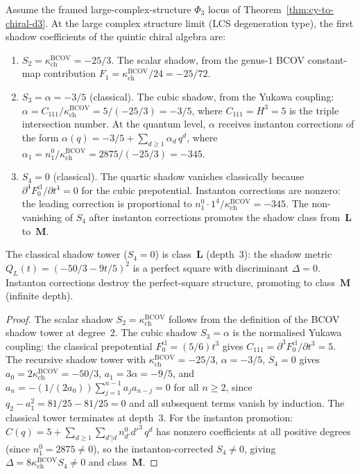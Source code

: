 \begin{proposition}
\label{prop:quintic-shadow-coefficients}
Assume the framed large-complex-structure $\Phi_3$ locus of
Theorem~\textup{\ref{thm:cy-to-chiral-d3}}. At the large complex
structure limit \textup{(}LCS degeneration type\textup{)}, the first
shadow coefficients of the quintic chiral algebra are:
\begin{enumerate}[label=(\roman*)]
 \item $S_2 = \kappa_{\mathrm{ch}}^{\mathrm{BCOV}} = -25/3$. The scalar shadow, from the genus-$1$ BCOV constant-map contribution $F_1 = \kappa_{\mathrm{ch}}^{\mathrm{BCOV}}/24 = -25/72$.
 \item $S_3 = \alpha = -3/5$ \textup{(}classical\textup{)}. The cubic shadow, from the Yukawa coupling: $\alpha = C_{111}/\kappa_{\mathrm{ch}}^{\mathrm{BCOV}} = 5/(-25/3) = -3/5$, where $C_{111} = H^3 = 5$ is the triple intersection number. At the quantum level, $\alpha$ receives instanton corrections of the form $\alpha(q) = -3/5 + \sum_{d \geq 1} \alpha_d \, q^d$, where $\alpha_1 = n^0_1 / \kappa_{\mathrm{ch}}^{\mathrm{BCOV}} = 2875/(-25/3) = -345$.
 \item $S_4 = 0$ \textup{(}classical\textup{)}. The quartic shadow vanishes classically because $\partial^4 F_0^{\mathrm{cl}} / \partial t^4 = 0$ for the cubic prepotential. Instanton corrections are nonzero: the leading correction is proportional to $n^0_1 \cdot 1^4 / \kappa_{\mathrm{ch}}^{\mathrm{BCOV}} = -345$. The non-vanishing of $S_4$ after instanton corrections promotes the shadow class from~$\mathbf{L}$ to~$\mathbf{M}$.
\end{enumerate}
The classical shadow tower \textup{(}$S_4 = 0$\textup{)} is class~$\mathbf{L}$ \textup{(}depth~$3$\textup{)}: the shadow metric $Q_L(t) = (-50/3 - 9t/5)^2$ is a perfect square with discriminant $\Delta = 0$. Instanton corrections destroy the perfect-square structure, promoting to class~$\mathbf{M}$ \textup{(}infinite depth\textup{)}.
\end{proposition}

\begin{proof}
The scalar shadow $S_2 = \kappa_{\mathrm{ch}}^{\mathrm{BCOV}}$ follows from the definition of the BCOV shadow tower at degree~$2$. The cubic shadow $S_3 = \alpha$ is the normalised Yukawa coupling: the classical prepotential $F_0^{\mathrm{cl}} = (5/6) t^3$ gives $C_{111} = \partial^3 F_0^{\mathrm{cl}} / \partial t^3 = 5$. The recursive shadow tower with $\kappa_{\mathrm{ch}}^{\mathrm{BCOV}} = -25/3$, $\alpha = -3/5$, $S_4 = 0$ gives $a_0 = 2\kappa_{\mathrm{ch}}^{\mathrm{BCOV}} = -50/3$, $a_1 = 3\alpha = -9/5$, and $a_n = -(1/(2a_0)) \sum_{j=1}^{n-1} a_j a_{n-j} = 0$ for all $n \geq 2$, since $q_2 - a_1^2 = 81/25 - 81/25 = 0$ and all subsequent terms vanish by induction. The classical tower terminates at depth~$3$. For the instanton promotion: $C(q) = 5 + \sum_{d \geq 1} \sum_{d'|d} n^0_{d'} {d'}^3 \, q^d$ has nonzero coefficients at all positive degrees (since $n^0_1 = 2875 \neq 0$), so the instanton-corrected $S_4 \neq 0$, giving $\Delta = 8 \kappa_{\mathrm{ch}}^{\mathrm{BCOV}} S_4 \neq 0$ and class~$\mathbf{M}$.
\end{proof}

